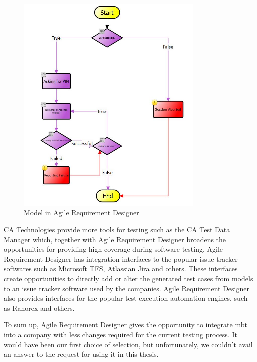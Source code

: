 \begin{figure} [htbp!]
	\centering
					\includegraphics[width=0.8\textwidth]{figures/AgileRequirementDesigner_Charts.JPG}
					\caption{\label{Fig:AgileRequirementDesigner_Charts} Model in Agile Requirement Designer}
\end{figure}

\par
CA Technologies provide more tools for testing such as the CA Test Data Manager which, together with Agile Requirement Designer broadens the opportunities for providing high coverage during software testing. Agile Requirement Designer has integration interfaces to the popular issue tracker softwares such as Microsoft TFS, Atlassian Jira and others. These interfaces create opportunities to directly add or alter the generated test cases from models to an issue tracker software used by the companies. Agile Requirement Designer also provides interfaces for the popular test execution automation engines, such as Ranorex and others.

\par
To sum up, Agile Requirement Designer gives the opportunity to integrate \acrshort{mbt} into a company with less changes required for the current testing process. It would have been our first choice of selection, but unfortunately, we couldn't avail an answer to the request for using it in this thesis.

